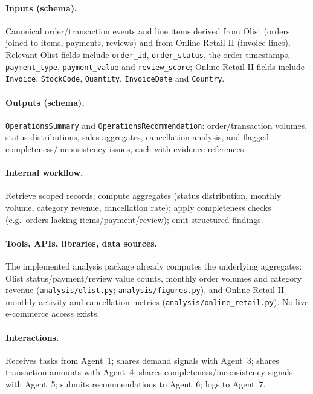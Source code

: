 \documentclass[11pt,a4paper]{article}
\newcommand{\code}[1]{\texttt{#1}}
\begin{document}
\paragraph{Inputs (schema).} Canonical order/transaction events and line items derived from Olist (orders joined to items, payments, reviews) and from Online Retail II (invoice lines). Relevant Olist fields include \code{order\_id}, \code{order\_status}, the order timestamps, \code{payment\_type}, \code{payment\_value} and \code{review\_score}; Online Retail II fields include \code{Invoice}, \code{StockCode}, \code{Quantity}, \code{InvoiceDate} and \code{Country}.

\paragraph{Outputs (schema).} \code{OperationsSummary} and \code{OperationsRecommendation}: order/transaction volumes, status distributions, sales aggregates, cancellation analysis, and flagged completeness/inconsistency issues, each with evidence references.

\paragraph{Internal workflow.} Retrieve scoped records; compute aggregates (status distribution, monthly volume, category revenue, cancellation rate); apply completeness checks (e.g.\ orders lacking items/payment/review); emit structured findings.

\paragraph{Tools, APIs, libraries, data sources.} The implemented analysis package already computes the underlying aggregates: Olist status/payment/review value counts, monthly order volumes and category revenue (\code{analysis/olist.py}; \code{analysis/figures.py}), and Online Retail II monthly activity and cancellation metrics (\code{analysis/online\_retail.py}). No live e-commerce access exists.

\paragraph{Interactions.} Receives tasks from Agent~1; shares demand signals with Agent~3; shares transaction amounts with Agent~4; shares completeness/inconsistency signals with Agent~5; submits recommendations to Agent~6; logs to Agent~7.
\end{document}
